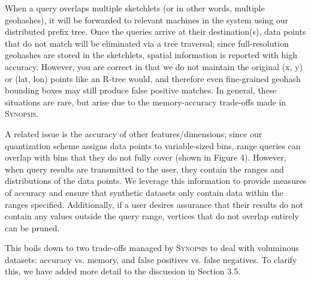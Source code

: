 \documentclass{article}
\begin{document}
\begin{tcolorbox}
    When a query overlaps multiple sketchlets (or in other words, multiple geohashes), it will be forwarded to relevant machines in the system using our distributed prefix tree. Once the queries arrive at their destination(s), data points that do not match will be eliminated via a tree traversal; since full-resolution geohashes are stored in the sketchlets, spatial information is reported with high accuracy. However, you are correct in that we do not maintain the original (x, y) or (lat, lon) points like an R-tree would, and therefore even fine-grained geohash bounding boxes may still produce false positive matches. In general, these situations are rare, but arise due to the memory-accuracy trade-offs made in \textsc{Synopsis}.

    A related issue is the accuracy of other features/dimensions; since our quantization scheme assigns data points to variable-sized bins, range queries can overlap with bins that they do not fully cover (shown in Figure 4). However, when query results are transmitted to the user, they contain the ranges and distributions of the data points. We leverage this information to provide measures of accuracy and ensure that synthetic datasets only contain data within the ranges specified. Additionally, if a user desires assurance that their results do not contain any values outside the query range, vertices that do not overlap entirely can be pruned.

    This boils down to two trade-offs managed by \textsc{Synopsis} to deal with voluminous datasets: accuracy vs. memory, and false positives vs. false negatives. To clarify this, we have added more detail to the discussion in Section 3.5.
\end{tcolorbox}
\end{document}
